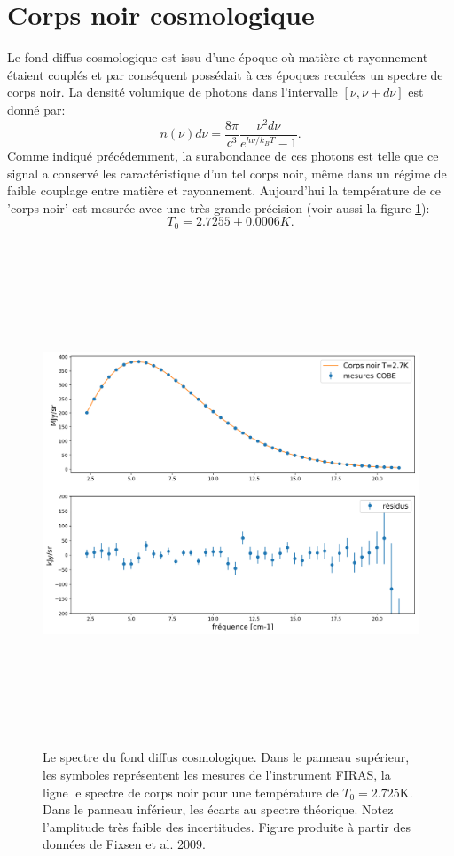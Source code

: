 \section{Corps noir cosmologique}
Le fond diffus cosmologique est issu d'une époque où matière et rayonnement étaient couplés et par conséquent possédait à ces époques reculées un spectre de corps noir. La densité volumique de photons dans l'intervalle $[\nu,\nu+d\nu]$ est donné par:
\begin{equation}
n(\nu)d\nu=\frac{8\pi}{c^3}\frac{\nu^2d\nu}{e^{h\nu/k_BT}-1}.
\end{equation}
Comme indiqué précédemment, la surabondance de ces photons est telle que ce signal a conservé les caractéristique d'un tel corps noir, même dans un régime de faible couplage entre matière et rayonnement. Aujourd'hui la température de ce 'corps noir' est mesurée avec une très grande précision  (voir aussi la figure \ref{f:bb}):
\begin{equation}
T_0=2.7255\pm0.0006 K.
\end{equation}
\begin{figure}[htbp]
	\centering
		\includegraphics[height=15cm]{figs/bb.png}
		\caption[Le spectre du fond diffus cosmologique]{Le spectre du fond diffus cosmologique. Dans le panneau supérieur, les symboles représentent les mesures de l'instrument FIRAS, la ligne le spectre de corps noir pour une température de $T_0=2.725$K. Dans le panneau inférieur, les écarts au spectre théorique. Notez l'amplitude très faible des incertitudes. Figure produite à partir des données de Fixsen et al. 2009.}
	\label{f:bb}
\end{figure}
